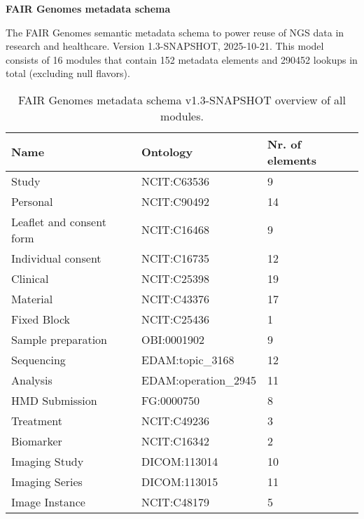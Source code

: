 \documentclass{article}
\begin{document}
\setlength\parindent{0pt}

\textbf{FAIR Genomes metadata schema}
\newline

The FAIR Genomes semantic metadata schema to power reuse of NGS data in research and healthcare. Version 1.3-SNAPSHOT, 2025-10-21. This model consists of 16 modules that contain 152 metadata elements and 290452 lookups in total (excluding null flavors).

\begin{table}[htb]
\begin{tabular}{lll}
Name & Ontology & Nr. of elements \\
\hline
Study & NCIT:C63536 & 9 \\
Personal & NCIT:C90492 & 14 \\
Leaflet and consent form & NCIT:C16468 & 9 \\
Individual consent & NCIT:C16735 & 12 \\
Clinical & NCIT:C25398 & 19 \\
Material & NCIT:C43376 & 17 \\
Fixed Block & NCIT:C25436 & 1 \\
Sample preparation & OBI:0001902 & 9 \\
Sequencing & EDAM:topic\_3168 & 12 \\
Analysis & EDAM:operation\_2945 & 11 \\
HMD Submission & FG:0000750 & 8 \\
Treatment & NCIT:C49236 & 3 \\
Biomarker & NCIT:C16342 & 2 \\
Imaging Study & DICOM:113014 & 10 \\
Imaging Series & DICOM:113015 & 11 \\
Image Instance & NCIT:C48179 & 5 \\
\hline
\end{tabular}
\caption[Module overview]{\label{table:table1} FAIR Genomes metadata schema v1.3-SNAPSHOT overview of all modules.}
\end{table}
\end{document}
